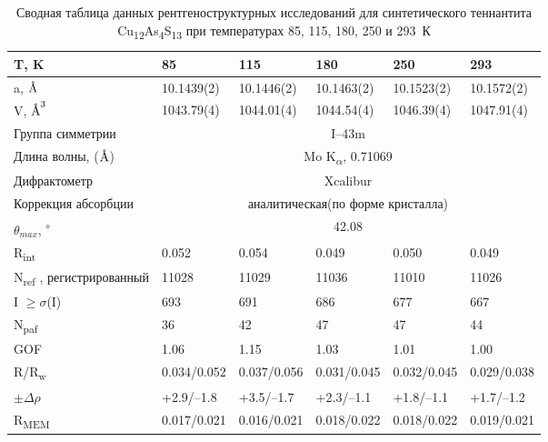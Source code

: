 \begin{landscape}
\begin{table} [htbp]
\centering
\caption{Сводная таблица данных рентгеноструктурных исследований для синтетического теннантита Cu\textsubscript{12}As\textsubscript{4}S\textsubscript{13} при температурах 85, 115, 180, 250 и 293~К}%
	\label{xray1}%
    \renewcommand{\arraystretch}{1.5}
	\begin{tabular}{@{}@{\extracolsep{20pt}}llllll@{}}
 \toprule     %
T, K                       & 85          & 115         & 180         & 250         & 293         \\
   \midrule
a, $\mbox{\normalfont\AA}$                       & 10.1439(2)  & 10.1446(2)  & 10.1463(2)  & 10.1523(2)  & 10.1572(2)  \\ \hline
V, $\mbox{\normalfont\AA}^3$                      & 1043.79(4)      & 1044.01(4)      & 1044.54(4)      & 1046.39(4)      & 1047.91(4)      \\ \hline
Группа симметрии                     &\multicolumn{5}{c}{ I–43m  }                                         \\ \hline
Длина волны, ($\mbox{\normalfont\AA}$) & \multicolumn{5}{c}{Mo K\textsubscript{$\alpha$}, 0.71069 } \\ \hline
Дифрактометр             & \multicolumn{5}{c}{Xcalibur}                                       \\ \hline
Коррекция абсорбции      & \multicolumn{5}{c}{аналитическая(по форме кристалла)} \\ \hline
$\theta_{max}$,\textsuperscript{ $\circ$ }                 &  \multicolumn{5}{c}{42.08 } \\ \hline
R\textsubscript{int}                       & 0.052       & 0.054       & 0.049       & 0.050       & 0.049       \\ \hline
N\textsubscript{ref} , регистрированный           & 11028       & 11029       & 11036       & 11010       & 11026       \\ \hline
I $\geq \sigma$(I)                  & 693         & 691         & 686         & 677         & 667         \\ \hline
N\textsubscript{paf}                       & 36          & 42          & 47          & 47          & 44          \\ \hline
GOF                        & 1.06        & 1.15        & 1.03        & 1.01        & 1.00        \\ \hline
R/R\textsubscript{w}                     & 0.034/0.052 & 0.037/0.056 & 0.031/0.045 & 0.032/0.045 & 0.029/0.038 \\ \hline
$\pm\Delta\rho   $                     & +2.9/–1.8   & +3.5/–1.7   & +2.3/–1.1   & +1.8/–1.1   & +1.7/–1.2   \\ \hline
R\textsubscript{MEM}                     & 0.017/0.021 & 0.016/0.021 & 0.018/0.022 & 0.018/0.022 & 0.019/0.021\\ \hline
 \bottomrule
\end{tabular}
\end{table}
\end{landscape}


